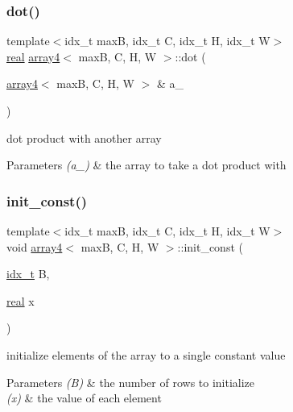 \subsubsection{\texorpdfstring{dot()}{dot()}}
{\footnotesize\ttfamily template$<$idx\+\_\+t maxB, idx\+\_\+t C, idx\+\_\+t H, idx\+\_\+t W$>$ \\
\hyperlink{vgg__util_8h_a1082d08aaa761215ec83e7149f27ad16}{real} \hyperlink{structarray4}{array4}$<$ maxB, C, H, W $>$\+::dot (\begin{DoxyParamCaption}\item[{\hyperlink{structarray4}{array4}$<$ maxB, C, H, W $>$ \&}]{a\+\_\+ }\end{DoxyParamCaption})\hspace{0.3cm}{\ttfamily [inline]}}



dot product with another array 


\begin{DoxyParams}{Parameters}
{\em (a\+\_\+)} & the array to take a dot product with \\
\hline
\end{DoxyParams}
\mbox{\label{structarray4_a517a9404ca45ae3a0682f9b6a33300a8}} 
\subsubsection{\texorpdfstring{init\+\_\+const()}{init\_const()}}
{\footnotesize\ttfamily template$<$idx\+\_\+t maxB, idx\+\_\+t C, idx\+\_\+t H, idx\+\_\+t W$>$ \\
void \hyperlink{structarray4}{array4}$<$ maxB, C, H, W $>$\+::init\+\_\+const (\begin{DoxyParamCaption}\item[{\hyperlink{vgg__util_8h_a8e93478a00e685bea5e6a3f617bf03a3}{idx\+\_\+t}}]{B,  }\item[{\hyperlink{vgg__util_8h_a1082d08aaa761215ec83e7149f27ad16}{real}}]{x }\end{DoxyParamCaption})\hspace{0.3cm}{\ttfamily [inline]}}



initialize elements of the array to a single constant value 


\begin{DoxyParams}{Parameters}
{\em (\+B)} & the number of rows to initialize \\
\hline
{\em (x)} & the value of each element \\
\hline
\end{DoxyParams}
\mbox{\label{structarray4_a6bc347ffd284538e10e8d06a328cf6c4}} 
